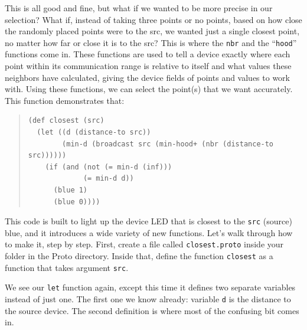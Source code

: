\documentclass{article}
\newcommand\var[1]{{\tt #1}}
\newcommand\qvar[1]{``{\tt #1}''}
\begin{document}
This is all good and fine, but what if we wanted to be more precise in
our selection?  What if, instead of taking three points or no points,
based on how close the randomly placed points were to the src, we
wanted just a single closest point, no matter how far or close it is
to the src?  This is where the \var{nbr} and the \qvar{hood} functions
come in.  These functions are used to tell a device exactly where each
point within its communication range is relative to itself and what
values these neighbors have calculated, giving the device fields of
points and values to work with. Using these functions, we can select
the point(s) that we want accurately. This function demonstrates that:

\begin{quote}
\begin{verbatim}
(def closest (src) 
  (let ((d (distance-to src)) 
        (min-d (broadcast src (min-hood+ (nbr (distance-to src)))))) 
    (if (and (not (= min-d (inf))) 
             (= min-d d)) 
      (blue 1)
      (blue 0))))
\end{verbatim}
\end{quote}

This code is built to light up the device LED that is closest to the
\var{src} (source) blue, and it introduces a wide variety of new
functions.  Let's walk through how to make it, step by step.  First,
create a file called \var{closest.proto} inside your folder in the
Proto directory.  Inside that, define the function \var{closest} as a
function that takes argument \var{src}.

We see our \var{let} function again, except this time it defines two
separate variables instead of just one.  The first one we know
already: variable \var{d} is the distance to the source device. The
second definition is where most of the confusing bit comes in.
\end{document}
